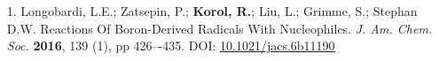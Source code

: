 \documentclass[11pt]{res}
\begin{document}
\begin{resume}
\begin{enumerate}
	\item[1.] Longobardi, L.E.; Zatsepin, P.; \textbf{Korol, R.}; Liu, L.; Grimme, S.; Stephan D.W. Reactions Of Boron-Derived Radicals With Nucleophiles. \textit{J. Am. Chem. Soc.} \textbf{2016}, 139 (1), pp 426–-435. DOI: \href{http://pubs.acs.org/doi/abs/10.1021/jacs.6b11190}{10.1021/jacs.6b11190}
\end{enumerate}
 

\end{resume}
\end{document}
